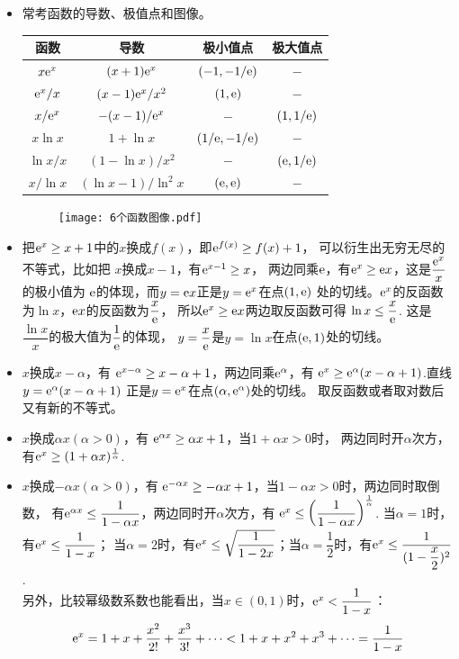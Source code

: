 \begin{itemize}[leftmargin=\inteval{\myitemleftmargin}pt,itemsep=
   \inteval{\myitemitempsep}pt,topsep=\inteval{\myitemtopsep}pt]
\item 常考函数的导数、极值点和图像。
\begin{table}[h]
\centering
\begin{tabular}{c|ccc}
    函数 & 导数 & 极小值点 & 极大值点 \\
    \hline
    $ x\mathrm{e}^x  $ & $(x+1)\mathrm{e}^x  $ & $(-1,-1/\mathrm{e})  $ & $ - $ \\
    $ \mathrm{e}^x/x $ & $ (x-1)\mathrm{e}^x/x^2  $ & $ (1,\mathrm{e}) $ & $ - $ \\
    $ x/\mathrm{e}^x $ & $ -(x-1)/\mathrm{e}^x $ & $ - $ & $ (1,1/\mathrm{e}) $ \\
    $ x\ln x $ & $ 1+\ln x $ & $ (1/\mathrm{e},-1/\mathrm{e})  $ & $ - $ \\
    $ \ln x/x $ & $ (1-\ln x)/x^2  $ & $ - $ & $ (\mathrm{e},1/\mathrm{e})  $ \\
    $ x/\ln x $ & $ (\ln x-1)/\ln^2 x  $ & $ (\mathrm{e},\mathrm{e}) $ & $ - $ 	
\end{tabular}
\end{table} 
\begin{figure}[h]
    \centering
    \texttt{[image: 6个函数图像.pdf]}
\end{figure}

\item 把$ \mathrm{e}^x\geq x+1 $中的$ x $换成$ f(x) $，即$ \mathrm{e}^{f(x)} \geq f(x)+1 $，
可以衍生出无穷无尽的不等式，比如把
$ x $换成$ x-1 $，有$ \mathrm{e}^{x-1}\geq x $，
两边同乘$ \mathrm{e} $，有$ \mathrm{e}^x\geq \mathrm{e} x $，这是$ \dfrac{\mathrm{e}^x}{x} $的极小值为
$ \mathrm{e} $的体现，而$ y=\mathrm{e} x $正是$ y=\mathrm{e}^x $在点$ (1,\mathrm{e}) $
处的切线。$ \mathrm{e}^x $的反函数为$ \ln x $，$ \mathrm{e} x $的反函数为$ \dfrac{x}{\mathrm{e}} $，
所以$ \mathrm{e}^x\geq \mathrm{e} x $两边取反函数可得 $ \ln x\leq \dfrac{x}{\mathrm{e}} $.
这是$ \dfrac{\ln x}{x} $的极大值为$ \dfrac{1}{\mathrm{e}} $的体现，
$ y=\dfrac{x}{\mathrm{e}} $是$ y=\ln x $在点$ (\mathrm{e},1) $处的切线。

\item $ x $换成$ x-\alpha $，有
$ \mathrm{e}^{x-\alpha}\geq x-\alpha+1 $，两边同乘$ \mathrm{e}^{\alpha} $，有
$ \mathrm{e}^x \geq \mathrm{e}^{\alpha}(x-\alpha+1) $.直线$ y=\mathrm{e}^{\alpha}(x-\alpha+1) $
正是$ y=\mathrm{e}^x $在点$ (\alpha,\mathrm{e}^{\alpha}) $处的切线。
取反函数或者取对数后又有新的不等式。

\item $ x $换成$ \alpha x (\alpha>0)$，有
$ \mathrm{e}^{\alpha x}\geq \alpha x+1 $，当$ 1+\alpha x>0 $时，
两边同时开$ \alpha $次方，有$ \mathrm{e}^x\geq (1+\alpha x)^{\frac{1}{\alpha}} $. 

\item $ x $换成$ -\alpha x (\alpha>0)$，有
$ \mathrm{e}^{-\alpha x}\geq -\alpha x+1 $，当$ 1-\alpha x>0 $时，两边同时取倒数，
有$ \mathrm{e}^{\alpha x}\leq \dfrac{1}{1-\alpha x} $，两边同时开$ \alpha $次方，有
$ \mathrm{e}^x \leq \left(\dfrac{1}{1-\alpha x} \right)^{\frac{1}{\alpha}} $. 
当$ \alpha=1 $时，有$ \mathrm{e}^x \leq \dfrac{1}{1-x} $；
当$ \alpha=2 $时，有$ \mathrm{e}^x \leq \sqrt{\dfrac{1}{1-2x}} $；当$ \alpha=\dfrac{1}{2} $时，有$ \mathrm{e}^x \leq \dfrac{1}{(1-\dfrac{x}{2})^2} $. \\
另外，比较幂级数系数也能看出，当$ x \in (0, 1) $时，$ \mathrm{e}^x < \dfrac{1}{1-x} $：
\begin{align*}
    \mathrm{e}^x=1+x+\dfrac{x^2}{2!}+\dfrac{x^3}{3!}+\cdots < 1+x+x^2+x^3+\cdots =\dfrac{1}{1-x}
\end{align*}


\end{itemize}
